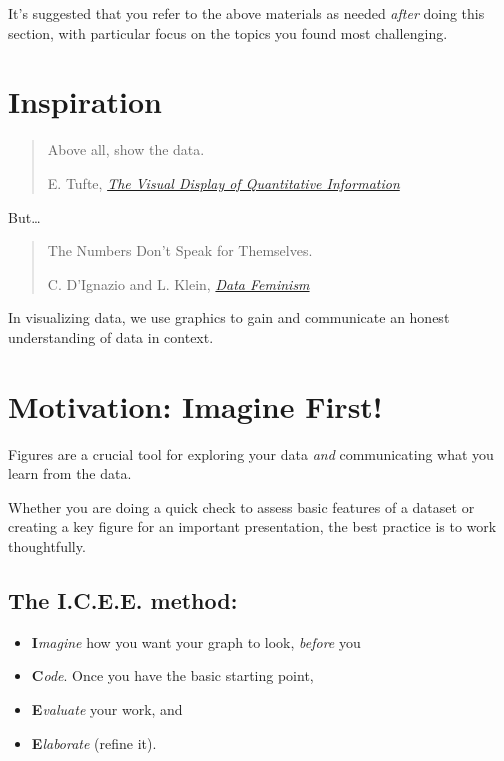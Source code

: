 \documentclass[
  letterpaper,
  DIV=11,
  numbers=noendperiod]{scrreprt}
\providecommand{\tightlist}{%
  \setlength{\itemsep}{0pt}\setlength{\parskip}{0pt}}\usepackage{longtable,booktabs,array}
\theoremstyle{remark}
\begin{document}
It's suggested that you refer to the above materials as needed
\emph{after} doing this section, with particular focus on the topics you
found most challenging.

\section*{Inspiration}\label{inspiration}


\begin{quote}
Above all, show the data.

E. Tufte, \href{https://www.edwardtufte.com/tufte/books_vdqi}{\emph{The
Visual Display of Quantitative Information}}
\end{quote}

But\ldots{}

\begin{quote}
The Numbers Don't Speak for Themselves.

C. D'Ignazio and L. Klein,
\href{https://data-feminism.mitpress.mit.edu/pub/czq9dfs5/release/2}{\emph{Data
Feminism}}
\end{quote}

In visualizing data, we use graphics to gain and communicate an honest
understanding of data in context.

\section*{Motivation: Imagine First!}\label{motivation-imagine-first}


Figures are a crucial tool for exploring your data \emph{and}
communicating what you learn from the data.

Whether you are doing a quick check to assess basic features of a
dataset or creating a key figure for an important presentation, the best
practice is to work thoughtfully.

\subsection*{\texorpdfstring{The \textbf{I.C.E.E.
method}:}{The I.C.E.E. method:}}\label{the-i.c.e.e.-method}

\begin{itemize}
\tightlist
\item
  \textbf{I}\emph{magine} how you want your graph to look, \emph{before}
  you
\item
  \textbf{C}\emph{ode}. Once you have the basic starting point,
\item
  \textbf{E}\emph{valuate} your work, and
\item
  \textbf{E}\emph{laborate} (refine it).
\end{itemize}
\end{document}
